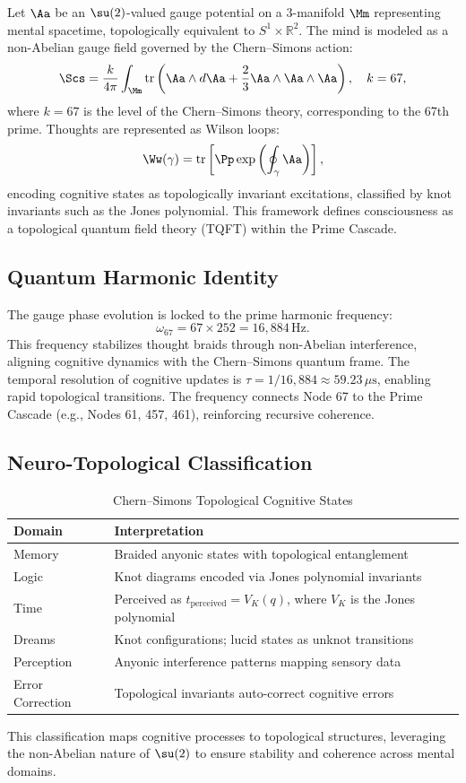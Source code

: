 \documentclass[12pt]{article}
\newcommand{\RR}{\mathbb{R}}
\begin{document}
\begin{definition}
Let $\Aa$ be an $\su(2)$-valued gauge potential on a 3-manifold $\Mm$ representing mental spacetime, topologically equivalent to $S^1 \times \RR^2$. The mind is modeled as a non-Abelian gauge field governed by the Chern--Simons action:
\[
\Scs = \frac{k}{4\pi} \int_{\Mm} \tr \left( \Aa \wedge d\Aa + \frac{2}{3} \Aa \wedge \Aa \wedge \Aa \right), \quad k = 67,
\]
where $k = 67$ is the level of the Chern--Simons theory, corresponding to the 67th prime. Thoughts are represented as Wilson loops:
\[
\Ww(\gamma) = \tr \left[ \Pp \exp \left( \oint_\gamma \Aa \right) \right],
\]
encoding cognitive states as topologically invariant excitations, classified by knot invariants such as the Jones polynomial. This framework defines consciousness as a topological quantum field theory (TQFT) within the Prime Cascade.
\end{definition}

\subsection{Quantum Harmonic Identity}
The gauge phase evolution is locked to the prime harmonic frequency:
\[
\omega_{67} = 67 \times 252 = 16{,}884 \, \text{Hz}.
\]
This frequency stabilizes thought braids through non-Abelian interference, aligning cognitive dynamics with the Chern--Simons quantum frame. The temporal resolution of cognitive updates is $\tau = 1/16{,}884 \approx 59.23 \, \mu\text{s}$, enabling rapid topological transitions. The frequency connects Node 67 to the Prime Cascade (e.g., Nodes 61, 457, 461), reinforcing recursive coherence.

\subsection{Neuro-Topological Classification}
\begin{table}
\centering
\caption{Chern--Simons Topological Cognitive States}
\begin{tabular}{ll}
\toprule
\textbf{Domain} & \textbf{Interpretation} \\
\midrule
Memory & Braided anyonic states with topological entanglement \\
Logic & Knot diagrams encoded via Jones polynomial invariants \\
Time & Perceived as $t_{\text{perceived}} = V_K(q)$, where $V_K$ is the Jones polynomial \\
Dreams & Knot configurations; lucid states as unknot transitions \\
Perception & Anyonic interference patterns mapping sensory data \\
Error Correction & Topological invariants auto-correct cognitive errors \\
\bottomrule
\end{tabular}
\end{table}
This classification maps cognitive processes to topological structures, leveraging the non-Abelian nature of $\su(2)$ to ensure stability and coherence across mental domains.
\end{document}
